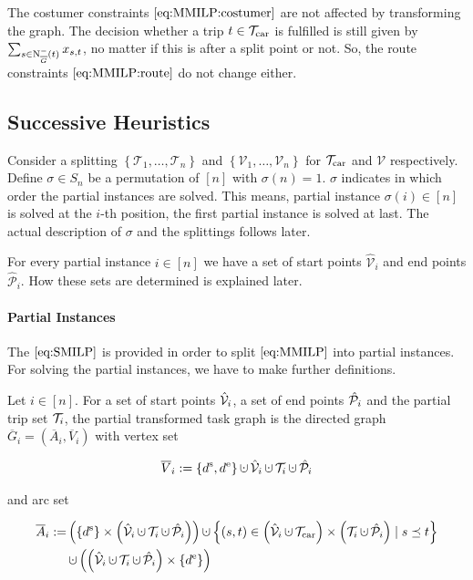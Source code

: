The costumer constraints $\eqref{eq:MMILP:costumer}$ are not affected by transforming the graph. The decision whether a trip $t\in\mathcal{T}_{\operatorname{car}}$ is fulfilled is still given by $\sum_{s\in\operatorname{N}_{\overline{G}}^-(t)} x_{s,t}$, no matter if this is after a split point or not. So, the route constraints $\eqref{eq:MMILP:route}$ do not change either.


\subsection{Successive Heuristics}

Consider a splitting $\left\{\mathcal{T}_1,\dots,\mathcal{T}_n\right\}$ and $\left\{\mathcal{V}_1,\dots,\mathcal{V}_n\right\}$ for $\mathcal{T}_{\operatorname{car}}$ and $\mathcal{V}$ respectively. Define $\sigma\in S_n$ be a permutation of $[n]$ with $\sigma(n)=1$. $\sigma$ indicates in which order the partial instances are solved. This means, partial instance $\sigma(i)\in[n]$ is solved at the $i$-th position, the first partial instance is solved at last. The actual description of $\sigma$ and the splittings follows later.

For every partial instance $i\in[n]$ we have a set of start points $\hat{\mathcal{V}}_i$ and end points $\hat{\mathcal{P}}_i$. How these sets are determined is explained later.

\paragraph{Partial Instances}\parfill

The $\eqref{eq:SMILP}$ is provided in order to split $\eqref{eq:MMILP}$ into partial instances. For solving the partial instances, we have to make further definitions.

\begin{definition}

Let $i\in[n]$. For a set of start points $\hat{\mathcal{V}}_i$, a set of end points $\hat{\mathcal{P}}_i$ and the partial trip set $\mathcal{T}_i$, the partial transformed task graph is the directed graph $\overline{G}_i=\left(\overline{A}_i,\overline{V}_i\right)$ with vertex set

\begin{align*}
	\overline{V}_i := \left\{\ds,\de\right\}\cupdot\Vhat_i\cupdot\Ti\cupdot\Phat_i
\end{align*}

and arc set

\begin{align*}
	\overline{A}_i := & \left(\left\{\ds\right\}\times\left(\Vhat_i\cupdot\Ti\cupdot\Phat_i\right)\right)\cupdot\left\{(s,t)\in\left(\Vhat_i\cupdot\Tcar\right)\times\left(\Ti\cupdot\Phat_i\right)\mid s\preceq t\right\} \\
	& \cupdot\left(\left(\Vhat_i\cupdot\Ti\cupdot\Phat_i\right)\times\left\{\de\right\}\right)
\end{align*}

\end{definition}


